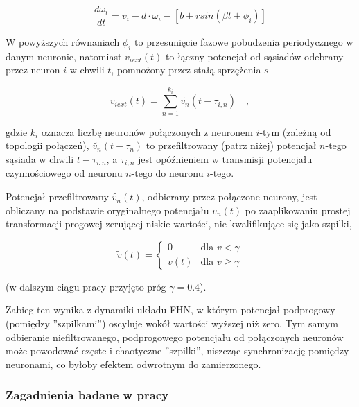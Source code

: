   \begin{equation} \label{eq:w2}
    \frac{d \omega_i}{dt} = v_i - d \cdot \omega_i - [b + r sin(\beta t + \phi_i)]
  \end{equation}

  W powyższych równaniach $\phi_i$ to przesunięcie fazowe pobudzenia periodycznego w danym neuronie, natomiast $v_{iext}(t)$ to łączny potencjał od sąsiadów odebrany przez neuron $i$ w chwili $t$, pomnożony przez stałą sprzężenia $s$

  \begin{equation} \label{eq:vext1}
    v_{iext}(t) = \displaystyle\sum\limits_{n=1}^{k_i} \widetilde{v_{n}}(t-\tau_{i,n}) \quad ,
  \end{equation}

  gdzie $k_i$ oznacza liczbę neuronów połączonych z neuronem $i$-tym (zależną od topologii połączeń), $\widetilde{v_{n}}(t-\tau_{n})$ to przefiltrowany (patrz niżej) potencjał $n$-tego sąsiada w chwili $t-\tau_{i,n}$, a $\tau_{i,n}$ jest opóźnieniem w transmisji potencjału czynnościowego od neuronu $n$-tego do neuronu $i$-tego.

  Potencjał przefiltrowany $\widetilde{v_{n}}(t)$, odbierany przez połączone neurony, jest obliczany na podstawie oryginalnego potencjału $v_{n}(t)$ po zaaplikowaniu prostej transformacji progowej zerującej niskie wartości, nie kwalifikujące się jako szpilki,

  \begin{equation}
    \tilde{v}(t) = 
    \begin{cases}
      0 & \text{dla } v < \gamma \\
      v(t) & \text{dla } v \geq \gamma 
    \end{cases}
  \end{equation}

  (w dalszym ciągu pracy przyjęto próg $\gamma = 0.4$).

  Zabieg ten wynika z dynamiki układu FHN, w którym potencjał podprogowy (pomiędzy ''szpilkami'') oscyluje wokół wartości wyższej niż zero. Tym samym odbieranie niefiltrowanego, podprogowego potencjału od połączonych neuronów może powodować częste i chaotyczne ''szpilki'', niszcząc synchronizację pomiędzy neuronami, co byłoby efektem odwrotnym do zamierzonego.
  
  \subsubsection{Zagadnienia badane w pracy}
  \label{sec:zagadnienia_badane}

